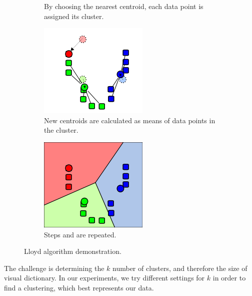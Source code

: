 \begin{figure}[ht]
\begin{subfigure}[t]{0.2\textwidth}
        \caption{By choosing the nearest centroid, each data point is assigned its cluster.}
        \label{fig:k-means-alg:assignment_step}
    \end{subfigure}\hfill
    \begin{subfigure}[t]{0.2\textwidth}
        \includegraphics[width=\textwidth]{Figures/k-means/k-means_update_step.png}
        \caption{New centroids are calculated as means of data points in the cluster.}
        \label{fig:k-means-alg:update_step}
    \end{subfigure}\hfill
    \begin{subfigure}[t]{0.2\textwidth}
        \includegraphics[width=\textwidth]{Figures/k-means/k-means_assignment_step_2.png}
        \caption{Steps  and  are repeated.}
        \label{fig:k-means-alg:assignment_step_2}
    \end{subfigure}\hfill
    \caption[Lloyd's algorithm demonstration.]{Lloyd algorithm demonstration. \cite{Wikikmeans}}
    \label{fig:k_means_alg}
\end{figure}
The challenge is determining the $k$ number of clusters, and therefore the size of visual dictionary. In our experiments, we try different settings for $k$ in order to find a clustering, which best represents our data.
